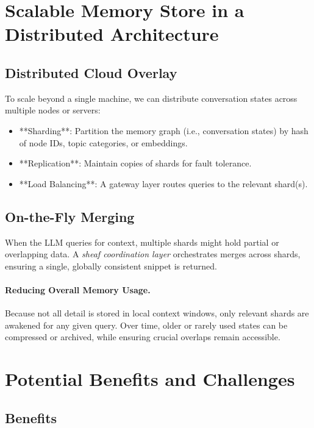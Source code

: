 \documentclass{article}
\begin{document}
\section{Scalable Memory Store in a Distributed Architecture}
\label{sec:scalable_store}

\subsection{Distributed Cloud Overlay}

To scale beyond a single machine, we can distribute conversation states across multiple nodes or servers:
\begin{itemize}
    \item **Sharding**: Partition the memory graph (i.e., conversation states) by hash of node IDs, topic categories, or embeddings.  
    \item **Replication**: Maintain copies of shards for fault tolerance.  
    \item **Load Balancing**: A gateway layer routes queries to the relevant shard(s).
\end{itemize}

\subsection{On-the-Fly Merging}

When the LLM queries for context, multiple shards might hold partial or overlapping data. A \emph{sheaf coordination layer} orchestrates merges across shards, ensuring a single, globally consistent snippet is returned.

\paragraph{Reducing Overall Memory Usage.}
Because not all detail is stored in local context windows, only relevant shards are awakened for any given query. Over time, older or rarely used states can be compressed or archived, while ensuring crucial overlaps remain accessible.

\section{Potential Benefits and Challenges}
\label{sec:benefits_challenges}

\subsection{Benefits}
\end{document}
